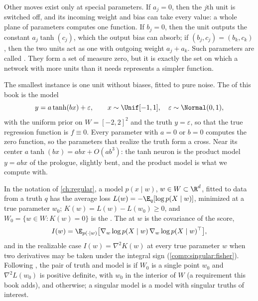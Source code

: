 \begin{refsection}
Other moves exist only at special parameters. If $a_j=0$, then the $j$th unit is switched off, and its incoming weight and bias can take every value: a whole plane of parameters computes one function. If $b_j=0$, then the unit outputs the constant $a_j\tanh(c_j)$, which the output bias can absorb; if $(b_j,c_j)=(b_k,c_k)$, then the two units act as one with outgoing weight $a_j+a_k$. Such parameters are called . They form a set of measure zero, but it is exactly the set on which a network with more units than it needs represents a simpler function.

The smallest instance is one unit without biases, fitted to pure noise. The  of this book is the model
\begin{equation}\label{eq:singular:tanh}
y=a\tanh(bx)+\varepsilon,\qquad x\sim\Unif[-1,1],\quad\varepsilon\sim\Normal(0,1),
\end{equation}
with the uniform prior on $W=[-2,2]^2$ and the truth $y=\varepsilon$, so that the true regression function is $f\equiv0$. Every parameter with $a=0$ or $b=0$ computes the zero function, so the parameters that realize the truth form a cross. Near its center $a\tanh(bx)=abx+O(ab^3)$: the tanh neuron is the product model $y=abx$ of the prologue, slightly bent, and the product model is what we compute with.

In the notation of \cref{ch:regular}, a model $p(x\mid w)$, $w\in W\subset\R^d$, fitted to data from a truth $q$ has the average loss $L(w)=-\E_q[\log p(X\mid w)]$, minimized at a true parameter $w_0$; $K(w)=L(w)-L(w_0)\ge0$, and $W_0=\{w\in W:K(w)=0\}$ is the . The  at $w$ is the covariance of the score,
\[
I(w)=\E_{p(\cdot\mid w)}\bigl[\nabla_w\log p(X\mid w)\,\nabla_w\log p(X\mid w)^\top\bigr],
\]
and in the realizable case $I(w)=\nabla^2K(w)$ at every true parameter $w$ when two derivatives may be taken under the integral sign (\cref{comp:singular:fisher}). Following \textcite[Definition~2]{Watanabe2010}, the pair of truth and model is  if $W_0$ is a single point $w_0$ and $\nabla^2L(w_0)$ is positive definite, with $w_0$ in the interior of $W$ (a requirement this book adds), and  otherwise; a singular model is a model with singular truths of interest.


\end{refsection}
